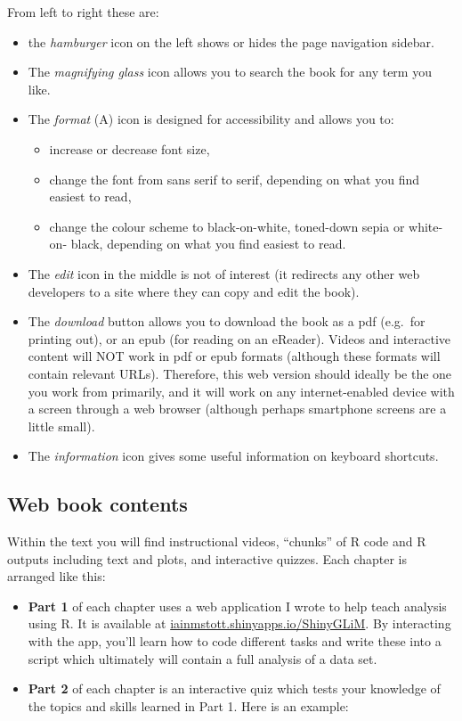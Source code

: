 \documentclass[
]{book}
\providecommand{\tightlist}{%
  \setlength{\itemsep}{0pt}\setlength{\parskip}{0pt}}
\begin{document}
From left to right these are:

\begin{itemize}
\tightlist
\item
  the \emph{hamburger} icon on the left shows or hides the page navigation
  sidebar.
\item
  The \emph{magnifying glass} icon allows you to search the book for any
  term you like.
\item
  The \emph{format} (A) icon is designed for accessibility and allows you to:

  \begin{itemize}
  \tightlist
  \item
    increase or decrease font size,
  \item
    change the font from sans serif to serif, depending on what you find easiest
    to read,
  \item
    change the colour scheme to black-on-white, toned-down sepia or white-on-
    black, depending on what you find easiest to read.
  \end{itemize}
\item
  The \emph{edit} icon in the middle is not of interest (it redirects any
  other web developers to a site where they can copy and edit the book).
\item
  The \emph{download}
  button allows you to download the book as a pdf (e.g.~for printing out), or an epub
  (for reading on an eReader). Videos and interactive content will NOT work in pdf
  or epub formats (although these formats will contain relevant URLs). Therefore,
  this web version should ideally be the one you work from primarily, and it will work
  on any internet-enabled device with a screen through a web browser (although
  perhaps smartphone screens are a little small).
\item
  The \emph{information} icon gives
  some useful information on keyboard shortcuts.
\end{itemize}

\hypertarget{web-book-contents}{%
\subsection{Web book contents}\label{web-book-contents}}

Within the text you will find instructional videos,
``chunks'' of R code and R outputs including text and plots, and interactive
quizzes. Each chapter is arranged like this:

\begin{itemize}
\tightlist
\item
  \textbf{Part 1} of each chapter uses a web application I wrote to help teach analysis
  using R. It is available at
  \url{iainmstott.shinyapps.io/ShinyGLiM}.
  By interacting with the app, you'll learn how to code different tasks and
  write these into a script which ultimately will contain a full analysis of a
  data set.
\item
  \textbf{Part 2} of each chapter is an interactive quiz which tests your knowledge of the
  topics and skills learned in Part 1. Here is an example:
\end{itemize}
\end{document}
